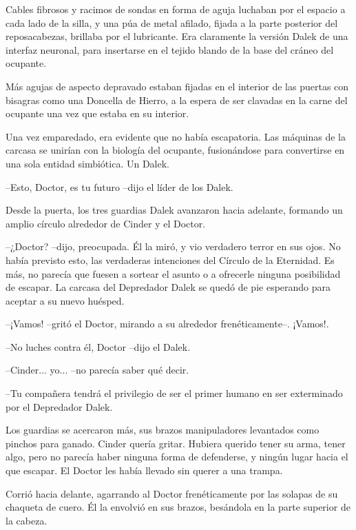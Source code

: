 Cables fibrosos y racimos de sondas en forma de aguja luchaban por el espacio a cada lado de la silla, y una púa de metal afilado, fijada a la parte posterior del reposacabezas, brillaba por el lubricante. Era claramente la versión Dalek de una interfaz neuronal, para insertarse en el tejido blando de la base del cráneo del ocupante.

Más agujas de aspecto depravado estaban fijadas en el interior de las puertas con bisagras como una Doncella de Hierro, a la espera de ser clavadas en la carne del ocupante una vez que estaba en su interior.

Una vez emparedado, era evidente que no había escapatoria. Las máquinas de la carcasa se unirían con la biología del ocupante, fusionándose para convertirse en una sola entidad simbiótica. Un Dalek.



--Esto, Doctor, es tu futuro --dijo el líder de los Dalek.



Desde la puerta, los tres guardias Dalek avanzaron hacia adelante, formando un amplio círculo alrededor de Cinder y el Doctor.



--¿Doctor? --dijo, preocupada. Él la miró, y vio verdadero terror en sus ojos. No había previsto esto, las verdaderas intenciones del Círculo de la Eternidad. Es más, no parecía que fuesen a sortear el asunto o a ofrecerle ninguna posibilidad de escapar. La carcasa del Depredador Dalek se quedó de pie esperando para aceptar a su nuevo huésped.



--¡Vamos! --gritó el Doctor, mirando a su alrededor frenéticamente--. ¡Vamos!.

--No luches contra él, Doctor --dijo el Dalek.

--Cinder... yo... --no parecía saber qué decir.

--Tu compañera tendrá el privilegio de ser el primer humano en ser exterminado por el Depredador Dalek.



Los guardias se acercaron más, sus brazos manipuladores levantados como pinchos para ganado. Cinder quería gritar. Hubiera querido tener su arma, tener algo, pero no parecía haber ninguna forma de defenderse, y ningún lugar hacia el que escapar. El Doctor les había llevado sin querer a una trampa.

Corrió hacia delante, agarrando al Doctor frenéticamente por las solapas de su chaqueta de cuero. Él la envolvió en sus brazos, besándola en la parte superior de la cabeza. 



